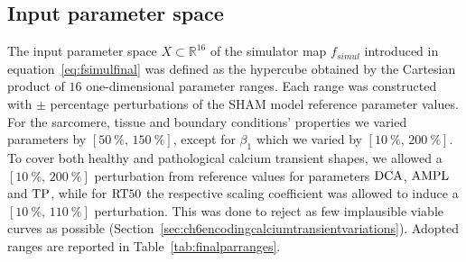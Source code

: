 \subsection{Input parameter space}\label{sec:ch7inputparameterspace}
The input parameter space $X\subset\mathbb{R}^{16}$ of the simulator map $f_{simul}$ introduced in equation~\eqref{eq:fsimulfinal} was defined as the hypercube obtained by the Cartesian product of $16$ one-dimensional parameter ranges. Each range was constructed with $\pm$ percentage perturbations of the SHAM model reference parameter values. For the sarcomere, tissue and boundary conditions' properties we varied parameters by $[\SI{50}{\percent},\,\SI{150}{\percent}]$, except for $\beta_1$ which we varied by $[\SI{10}{\percent},\,\SI{200}{\percent}]$. To cover both healthy and pathological calcium transient shapes, we allowed a $[\SI{10}{\percent},\,\SI{200}{\percent}]$ perturbation from reference values for parameters $\textrm{DCA}$, $\textrm{AMPL}$ and $\textrm{TP}$, while for $\textrm{RT50}$ the respective scaling coefficient was allowed to induce a $[\SI{10}{\percent},\,\SI{110}{\percent}]$ perturbation. This was done to reject as few implausible viable curves as possible (Section~\ref{sec:ch6encodingcalciumtransientvariations}). Adopted ranges are reported in Table~\ref{tab:finalparranges}.

